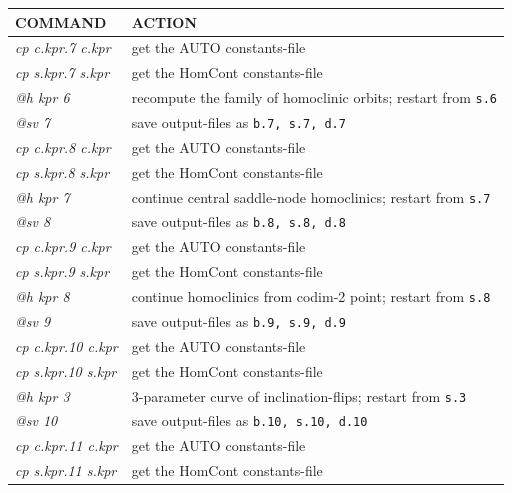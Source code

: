 \documentclass[12pt]{report}
\begin{document}
\begin{table}[htbp]
\begin{center}
\begin{tabular}{| l | l |}
\hline
  COMMAND  & ACTION \\
\hline
  {\it cp c.kpr.7 c.kpr} & get the AUTO constants-file \\ 
  {\it cp s.kpr.7 s.kpr} & get the HomCont constants-file \\ 
  {\it @h kpr 6} & recompute the family of homoclinic orbits; restart from {\tt s.6} \\ 
  {\it @sv 7} & save output-files as {\tt b.7, s.7, d.7} \\ 
\hline
  {\it cp c.kpr.8 c.kpr} & get the AUTO constants-file \\ 
  {\it cp s.kpr.8 s.kpr} & get the HomCont constants-file \\ 
  {\it @h kpr 7} & continue central saddle-node homoclinics; restart from {\tt s.7} \\ 
  {\it @sv 8} & save output-files as {\tt b.8, s.8, d.8} \\ 
\hline
  {\it cp c.kpr.9 c.kpr} & get the AUTO constants-file \\ 
  {\it cp s.kpr.9 s.kpr} & get the HomCont constants-file \\ 
  {\it @h kpr 8} & continue homoclinics from codim-2 point; restart from {\tt s.8} \\ 
  {\it @sv 9} & save output-files as {\tt b.9, s.9, d.9} \\ 
\hline
  {\it cp c.kpr.10 c.kpr} & get the AUTO constants-file \\ 
  {\it cp s.kpr.10 s.kpr} & get the HomCont constants-file \\ 
  {\it @h kpr 3} & 3-parameter curve of inclination-flips; restart from {\tt s.3} \\ 
  {\it @sv 10} & save output-files as {\tt b.10, s.10, d.10} \\ 
\hline
  {\it cp c.kpr.11 c.kpr} & get the AUTO constants-file \\ 
  {\it cp s.kpr.11 s.kpr} & get the HomCont constants-file \\ 

\end{tabular}
\end{center}
\end{table}
\end{document}
